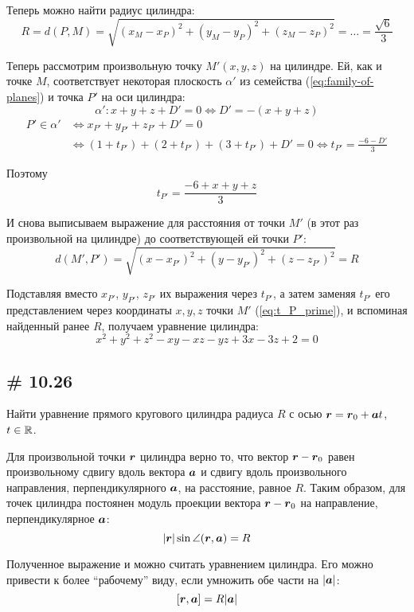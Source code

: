 \documentclass[a4paper,12pt]{article}
\begin{document}
\begin{solution}
    Теперь можно найти радиус цилиндра:
    \[
      R = d(P, M) = \sqrt{(x_M - x_P)^2 + (y_M - y_P)^2 + (z_M - z_P)^2} = \ldots = \frac{\sqrt{6}}{3}
    \]
    
    Теперь рассмотрим произвольную точку $M'(x, y, z)$ на цилиндре.
    Ей, как и точке $M$, соответствует некоторая плоскость $\alpha'$ из семейства (\ref{eq:family-of-planes}) и точка $P'$ на оси цилиндра:
    \[
      \alpha'\colon x + y + z + D' = 0 \Leftrightarrow D' = -(x + y + z)
    \]
    \begin{equation}
    \begin{split}
      P' \in \alpha' &\Leftrightarrow x_{P'} + y_{P'} + z_{P'} + D' = 0\\
      &\Leftrightarrow (1 + t_{P'}) + (2 + t_{P'}) + (3 + t_{P'}) + D' = 0
      \Leftrightarrow t_{P'} = \frac{-6 - D'}{3}
    \end{split}
    \end{equation}
    
    Поэтому
    \begin{equation}
      \label{eq:t_P_prime}
      t_{P'} = \frac{-6 + x + y + z}{3}
    \end{equation}
    
    И снова выписываем выражение для расстояния от точки $M'$ (в этот раз произвольной на цилиндре) до соответствующей ей точки $P'$:
    \[
      d(M', P') = \sqrt{(x - x_{P'})^2 + (y - y_{P'})^2 + (z - z_{P'})^2} = R
    \]
    
    Подставляя вместо $x_{P'}$, $y_{P'}$, $z_{P'}$ их выражения через $t_{P'}$, а затем заменяя $t_{P'}$ его представлением через координаты $x, y, z$ точки $M'$ (\ref{eq:t_P_prime}), и вспоминая найденный ранее $R$, получаем уравнение цилиндра:
    \[
      x^2 + y^2 + z^2 - xy - xz - yz + 3x - 3z + 2 = 0
    \]
  \end{solution}
  
  
  \subsection{\# 10.26}
  
  Найти уравнение прямого кругового цилиндра радиуса $R$ с осью $\bds r \hm= \bds r_0 + \bds a t$, $t \hm\in \RR$.
  
  \begin{solution}
    
    Для произвольной точки $\boldsymbol r$ цилиндра верно то, что вектор $\bds r \hm- \bds r_0$ равен произвольному сдвигу вдоль вектора $\boldsymbol a$ и сдвигу вдоль произвольного направления, перпендикулярного $\boldsymbol a$, на расстояние, равное $R$.
    Таким образом, для точек цилиндра постоянен модуль проекции вектора $\bds r \hm- \bds r_0$ на направление, перпендикулярное $\boldsymbol a$:
    \[
      |\boldsymbol r| \sin\angle{(\boldsymbol r, \boldsymbol a)} = R
    \]
    
    Полученное выражение и можно считать уравнением цилиндра.
    Его можно привести к более ``рабочему'' виду, если умножить обе части на $|\boldsymbol a|$:
    \[
      [\boldsymbol r, \boldsymbol a] = R |\boldsymbol a|
    \]
  \end{solution}
  
\end{document}
